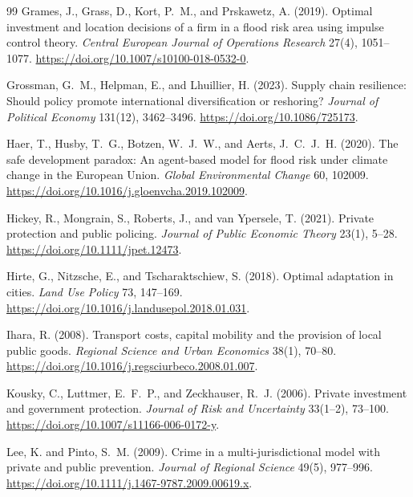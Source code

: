 \begin{thebibliography}{99}
Grames, J., Grass, D., Kort, P.~M., and Prskawetz, A. (2019).
\newblock Optimal investment and location decisions of a firm in a flood risk area using impulse control theory.
\newblock \emph{Central European Journal of Operations Research} 27(4), 1051--1077. \url{https://doi.org/10.1007/s10100-018-0532-0}.

Grossman, G.~M., Helpman, E., and Lhuillier, H. (2023).
\newblock Supply chain resilience: Should policy promote international diversification or reshoring?
\newblock \emph{Journal of Political Economy} 131(12), 3462--3496. \url{https://doi.org/10.1086/725173}.

Haer, T., Husby, T.~G., Botzen, W.~J.~W., and Aerts, J.~C.~J.~H. (2020).
\newblock The safe development paradox: An agent-based model for flood risk under climate change in the European Union.
\newblock \emph{Global Environmental Change} 60, 102009. \url{https://doi.org/10.1016/j.gloenvcha.2019.102009}.

Hickey, R., Mongrain, S., Roberts, J., and van Ypersele, T. (2021).
\newblock Private protection and public policing.
\newblock \emph{Journal of Public Economic Theory} 23(1), 5--28. \url{https://doi.org/10.1111/jpet.12473}.

Hirte, G., Nitzsche, E., and Tscharaktschiew, S. (2018).
\newblock Optimal adaptation in cities.
\newblock \emph{Land Use Policy} 73, 147--169. \url{https://doi.org/10.1016/j.landusepol.2018.01.031}.

Ihara, R. (2008).
\newblock Transport costs, capital mobility and the provision of local public goods.
\newblock \emph{Regional Science and Urban Economics} 38(1), 70--80. \url{https://doi.org/10.1016/j.regsciurbeco.2008.01.007}.

Kousky, C., Luttmer, E.~F.~P., and Zeckhauser, R.~J. (2006).
\newblock Private investment and government protection.
\newblock \emph{Journal of Risk and Uncertainty} 33(1--2), 73--100. \url{https://doi.org/10.1007/s11166-006-0172-y}.

Lee, K. and Pinto, S.~M. (2009).
\newblock Crime in a multi-jurisdictional model with private and public prevention.
\newblock \emph{Journal of Regional Science} 49(5), 977--996. \url{https://doi.org/10.1111/j.1467-9787.2009.00619.x}.


\end{thebibliography}
